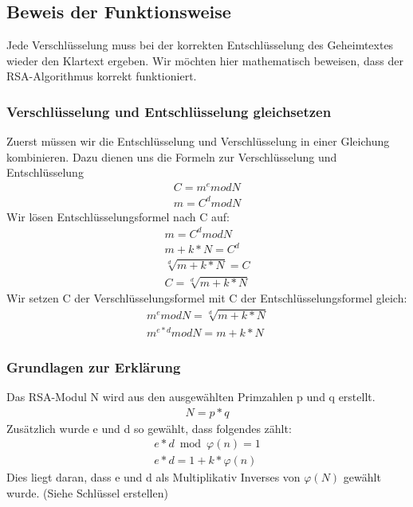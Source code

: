 \subsection{Beweis der Funktionsweise}
Jede Verschlüsselung muss bei der korrekten Entschlüsselung des Geheimtextes wieder den Klartext ergeben. Wir möchten hier mathematisch beweisen, dass der RSA-Algorithmus korrekt funktioniert.\\

\subsubsection{Verschlüsselung und Entschlüsselung gleichsetzen}
Zuerst müssen wir die Entschlüsselung und Verschlüsselung in einer Gleichung kombinieren. Dazu dienen uns die Formeln zur Verschlüsselung und Entschlüsselung\\
\begin{align}
  C = m^e mod N \\
  m = C^d mod N
\end{align}
Wir lösen Entschlüsselungsformel nach C auf:
\begin{align}
  m = C^d mod N \\
  m + k * N = C^d \\
  \sqrt[d]{m+k*N} = C \\
  C = \sqrt[d]{m+k*N}
\end{align}
Wir setzen C der Verschlüsselungsformel mit C der Entschlüsselungsformel gleich:
\begin{align}
  m^e mod N = \sqrt[d]{m+k*N}\\
  m^{e*d} mod N = m + k * N
\end{align}

\subsubsection{Grundlagen zur Erklärung}
Das RSA-Modul N wird aus den ausgewählten Primzahlen p und q erstellt.
\begin{align}
  N = p * q
\end{align}
Zusätzlich wurde e und d so gewählt, dass folgendes zählt:
\begin{align}
 e * d \bmod \varphi(n) = 1\\
 e * d = 1 + k * \varphi(n)
\end{align}
Dies liegt daran, dass e und d als Multiplikativ Inverses von $ \varphi(N) $ gewählt wurde. (Siehe Schlüssel erstellen) \\%

